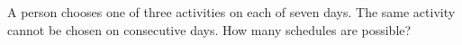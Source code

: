 A person chooses one of three activities on each of seven days. The same activity cannot be chosen on consecutive days. How many schedules are possible?
